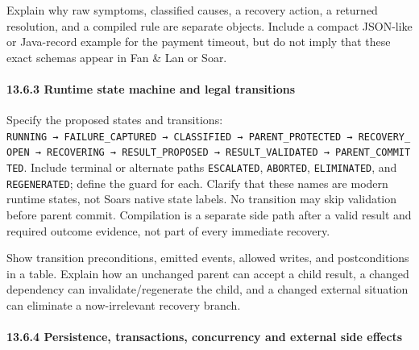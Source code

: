 Explain why raw symptoms, classified causes, a recovery action, a returned resolution, and a compiled rule are separate objects. Include a compact JSON-like or Java-record example for the payment timeout, but do not imply that these exact schemas appear in Fan \& Lan or Soar.

\paragraph{13.6.3 Runtime state machine and legal transitions}\label{1363-runtime-state-machine-and-legal-transitions}

Specify the proposed states and transitions: \texttt{RUNNING\ →\ FAILURE\_CAPTURED\ →\ CLASSIFIED\ →\ PARENT\_PROTECTED\ →\ RECOVERY\_OPEN\ →\ RECOVERING\ →\ RESULT\_PROPOSED\ →\ RESULT\_VALIDATED\ →\ PARENT\_COMMITTED}. Include terminal or alternate paths \texttt{ESCALATED}, \texttt{ABORTED}, \texttt{ELIMINATED}, and \texttt{REGENERATED}; define the guard for each. Clarify that these names are modern runtime states, not Soar\textquotesingle s native state labels. No transition may skip validation before parent commit. Compilation is a separate side path after a valid result and required outcome evidence, not part of every immediate recovery.

Show transition preconditions, emitted events, allowed writes, and postconditions in a table. Explain how an unchanged parent can accept a child result, a changed dependency can invalidate/regenerate the child, and a changed external situation can eliminate a now-irrelevant recovery branch.

\paragraph{13.6.4 Persistence, transactions, concurrency and external side effects}\label{1364-persistence-transactions-concurrency-and-external-side-effects}

